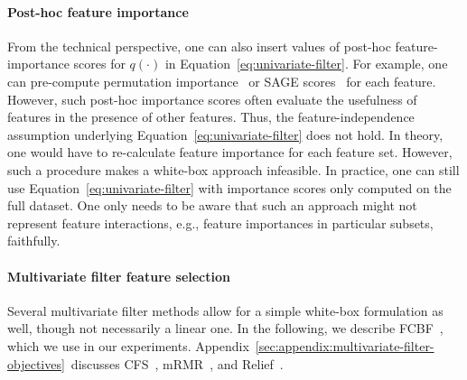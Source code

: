 \documentclass{article}
\theoremstyle{definition}
\begin{document}
\paragraph{Post-hoc feature importance}

From the technical perspective, one can also insert values of post-hoc feature-importance scores for $q(\cdot)$ in Equation~\ref{eq:univariate-filter}.
For example, one can pre-compute permutation importance~\cite{breiman2001random} or SAGE scores~\cite{covert2020understanding} for each feature.
However, such post-hoc importance scores often evaluate the usefulness of features in the presence of other features.
Thus, the feature-independence assumption underlying Equation~\ref{eq:univariate-filter} does not hold.
In theory, one would have to re-calculate feature importance for each feature set.
However, such a procedure makes a white-box approach infeasible.
In practice, one can still use Equation~\ref{eq:univariate-filter} with importance scores only computed on the full dataset.
One only needs to be aware that such an approach might not represent feature interactions, e.g., feature importances in particular subsets, faithfully.

\paragraph{Multivariate filter feature selection}

Several multivariate filter methods allow for a simple white-box formulation as well, though not necessarily a linear one.
In the following, we describe FCBF~\cite{yu2003feature}, which we use in our experiments.
Appendix~\ref{sec:appendix:multivariate-filter-objectives}~discusses CFS~\cite{hall1999correlation, hall2000correlation}, mRMR~\cite{peng2005feature}, and Relief~\cite{kira1992feature, robnik1997adaptation}.
\end{document}

